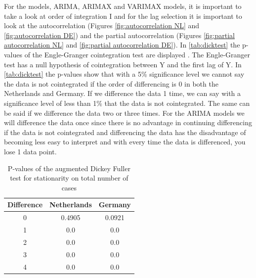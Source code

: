 For the models, ARIMA, ARIMAX and VARIMAX models, it is important to take a look at order of integration I and for the lag selection it is important to look at the autocorrelation (Figures \ref{fig:autocorrelation NL} and \ref{fig:autocorrelation DE}) and the partial autocorrelation (Figures \ref{fig:partial autocorrelation NL} and \ref{fig:partial autocorrelation DE}). In \autoref{tab:dicktest} the p-values of the Engle-Granger cointegration test are displayed \citep{Engle1987Co-IntegrationTesting}. The Engle-Granger test has a null hypothesis of cointegration between Y and the first lag of Y. In \autoref{tab:dicktest} the p-values show that with a 5\% significance level we cannot say the data is not cointegrated if the order of differencing is 0 in both the Netherlands and Germany. If we difference the data 1 time, we can say with a significance level of less than 1\% that the data is not cointegrated. The same can be said if we difference the data two or three times. For the ARIMA models we will difference the data once since there is no advantage in continuing differencing if the data is not cointegrated and differencing the data has the disadvantage of becoming less easy to interpret and with every time the data is differenced, you lose 1 data point.\\
\begin{table}[]
    \centering
    \begin{tabular}{|c|c c|}\hline    
        Difference & Netherlands & Germany\\ \hline
        0 & 0.4905  & 0.0921 \\
        1 & 0.0 & 0.0 \\
        2 & 0.0 & 0.0 \\
        3 & 0.0 & 0.0 \\
        4 & 0.0 & 0.0 \\
    \hline 
    \end{tabular}
    \caption{P-values of the augmented Dickey Fuller test for stationarity on total number of cases}
    \label{tab:dicktest}
\end{table}

